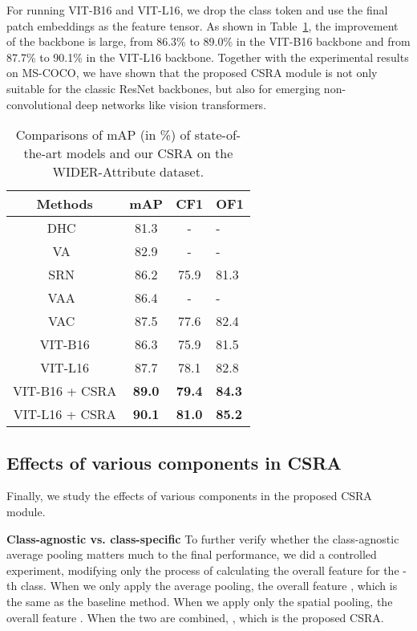 \documentclass[10pt,twocolumn,letterpaper]{article}
\begin{document}
For running VIT-B16 and VIT-L16, we drop the class token and use the final patch embeddings as the feature tensor. As shown in Table~\ref{tab:wider}, the improvement of the backbone is large, from 86.3\% to 89.0\% in the VIT-B16 backbone and from 87.7\% to 90.1\% in the VIT-L16 backbone. Together with the experimental results on MS-COCO, we have shown that the proposed CSRA module is not only suitable for the classic ResNet backbones, but also for emerging non-convolutional deep networks like vision transformers.

\begin{table}
	\caption{Comparisons of mAP (in \%) of state-of-the-art models and our CSRA on the WIDER-Attribute dataset.}
	\label{tab:wider}
	\centering
	\small
		\begin{tabular}{c|c|c|l}
			\hline
			Methods                    & mAP           & CF1           & OF1           \\ \hline\hline
			DHC~\cite{Wider} & 81.3          & -             & -             \\
			VA~\cite{VA_wider}         & 82.9          & -             & -             \\
			SRN~\cite{2017_CVPR_SRN}   & 86.2          & 75.9          & 81.3          \\
			VAA~\cite{2018_ECCV_CAM}       & 86.4          & -             & -             \\
			VAC~\cite{2019_CVPR_VA}    & 87.5          & 77.6          & 82.4          \\
			\hline
			VIT-B16                    & 86.3          & 75.9          & 81.5          \\
			VIT-L16                    & 87.7          & 78.1          & 82.8          \\
			VIT-B16 + CSRA          & \textbf{89.0} & \textbf{79.4} & \textbf{84.3} \\
			VIT-L16 + CSRA          & \textbf{90.1} & \textbf{81.0} & \textbf{85.2} \\
			\hline
		\end{tabular}
\end{table}

\subsection{Effects of various components in CSRA}

Finally, we study the effects of various components in the proposed CSRA module.

\vspace{6pt}\noindent\textbf{Class-agnostic vs. class-specific} To further verify whether the class-agnostic average pooling matters much to the final performance, we did a controlled experiment, modifying only the process of calculating the overall feature for the -th class. When we only apply the average pooling, the overall feature , which is the same as the baseline method. When we apply only the spatial pooling, the overall feature . When the two are combined, , which is the proposed CSRA.
\end{document}
